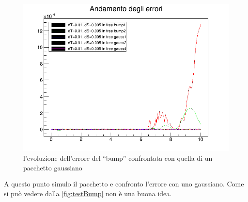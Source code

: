 \begin{figure}[hbt]
	\centering
	\includegraphics[width=0.5\linewidth]{IMG/testbump}
	\caption[Errore Bump]{l'evoluzione dell'errore del ``bump'' confrontata con quella di un pacchetto gaussiano}\label{fig:testBump}
\end{figure}

A questo punto simulo il pacchetto e confronto l'errore con uno gaussiano. Come si pu\`o vedere dalla \autoref{fig:testBump} non \`e una buona idea.

